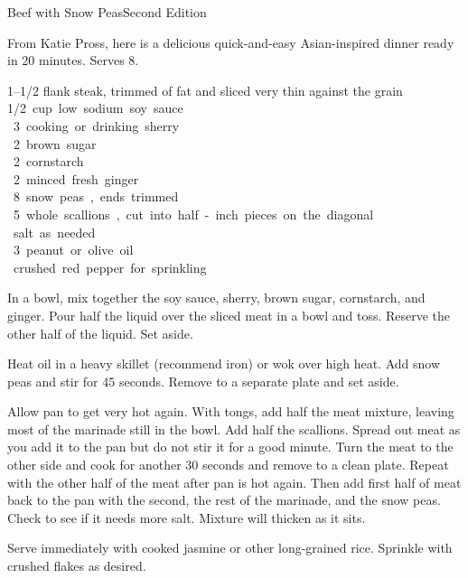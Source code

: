 \begin{entry}{Beef with Snow Peas}{Second Edition}

\begin{open}
From Katie Pross, here is a delicious quick-and-easy Asian-inspired dinner ready in 20 minutes. Serves 8.
\end{open}
\begin{ingredients}
  \SIrange{1}{1/2}{\pound} flank steak, trimmed of fat and sliced very thin against the grain\\
  \SI{1/2} cup low sodium soy sauce\\
  \SI{3}{\tblspoon} cooking or drinking sherry\\
  \SI{2}{\tblspoon} brown sugar \\
  \SI{2}{\tblspoon} cornstarch \\
  \SI{2}{\teaspoon} minced fresh ginger\\
  \SI{8}{\ounce} snow peas, ends trimmed \\
   5 whole scallions, cut into half-inch pieces on the diagonal \\
  salt as needed \\
    \SI{3}{\tblspoon} peanut or olive oil \\
  crushed red pepper for sprinkling \\

\end{ingredients}

In a bowl, mix together the soy sauce, sherry, brown sugar, cornstarch, and ginger. Pour half the liquid over the sliced meat in a bowl and toss. Reserve the other half of the liquid. Set aside.

Heat oil in a heavy skillet (recommend iron) or wok over high heat. Add snow peas and stir for 45 seconds. Remove to a separate plate and set aside.

Allow pan to get very hot again. With tongs, add half the meat mixture, leaving most of the marinade still in the bowl. Add half the scallions. Spread out meat as you add it to the pan but do not stir it for a good minute. Turn the meat to the other side and cook for another 30 seconds and remove to a clean plate. Repeat with the other half of the meat after pan is hot again. Then add first half of meat back to the pan with the second, the rest of the marinade, and the snow peas. Check to see if it needs more salt. Mixture will thicken as it sits.

Serve immediately with cooked jasmine or other long-grained rice. Sprinkle with crushed flakes as desired.

\end{entry}

